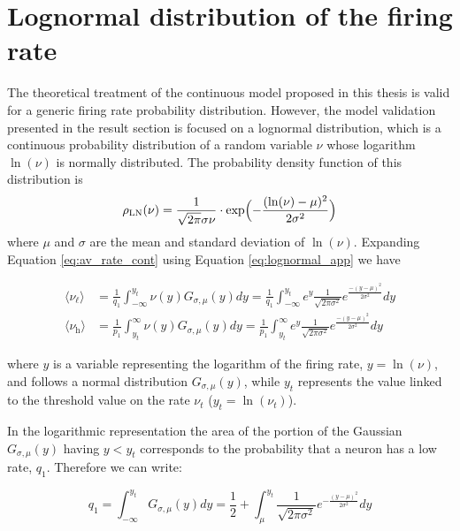 \documentclass[a4paper, 12pt, twoside, openright]{book}
\newcommand{\rh}{\nu_\text{h}}
\newcommand{\rl}{\nu_{\ell}}
\begin{document}
\chapter{Lognormal distribution of the firing rate}
\label{app:distr_fr}
The theoretical treatment of the continuous model proposed in this thesis is valid for a generic firing rate probability distribution. However, the model validation presented in the result section is focused on a lognormal distribution, which is a continuous probability distribution of a random variable $\nu$ whose logarithm 
$\ln(\nu)$ is normally distributed.
The probability density function of this distribution is
\begin{equation}
\label{eq:lognormal_app}
 \rho_\text{LN}(\nu) = \frac{1}{\sqrt{2\pi} \sigma \nu} \cdot \exp\Bigl( -\frac{(\ln(\nu)-\mu)^2}{2\sigma^2}\Bigr)
\end{equation}
where $\mu$ and $\sigma$ are the mean and standard deviation of $\ln(\nu)$.
Expanding Equation \eqref{eq:av_rate_cont} using Equation \eqref{eq:lognormal_app} we have

\begin{equation}
\begin{split}
    \langle \rl \rangle &=\frac{1}{q_1}\int_{-\infty}^{y_t} \nu(y)G_{\sigma, \mu}(y) dy=\frac{1}{q_1}\int_{-\infty}^{y_t} e^y \frac{1}{\sqrt{2\pi \sigma^2}}e^{\frac{-(y-\mu)^2}{2\sigma^2} } dy\\
    \langle \rh \rangle &= \frac{1}{p_1}\int_{y_{t}}^\infty \nu(y) G_{\sigma, \mu}(y) dy= \frac{1}{p_1}\int_{y_{t}}^\infty e^y \frac{1}{\sqrt{2\pi \sigma^2}} e^{\frac{-(y-\mu)^2}{2\sigma^2} } dy 
\end{split}
\label{eq:av_rate_cont2}
\end{equation}

where $y$ is a variable representing the logarithm of the firing rate, $y=\ln(\nu)$, and follows a normal distribution $G_{\sigma, \mu}(y)$, while $y_t$ represents the value linked to the threshold value on the rate $\nu_t$ ($y_t=\ln(\nu_t)$).

In the logarithmic representation the area of the portion of the Gaussian $G_{\sigma, \mu}(y)$ having $y<y_t$ corresponds to the probability that a neuron has a low rate, $q_1 $. Therefore we can write:

\begin{equation}
    q_1= \int_{-\infty}^{y_t} G_{\sigma, \mu}(y) dy= \frac{1}{2}+ \int_{\mu}^{y_t} \frac{1}{\sqrt{2 \pi \sigma^2}} e^{- \frac{(y-\mu)^2}{2 \sigma^2}} dy
\end{equation}
\end{document}
